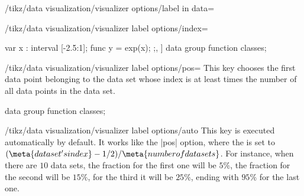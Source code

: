 \begin{key}{/tikz/data visualization/visualizer options/label in data=}
\begin{key}{/tikz/data visualization/visualizer label options/index=}
\begin{codeexample}
{{{    var x : interval [-2.5:1];
    func y = exp(\value x);
  }
};},
]
\tikz \datavisualization [
  school book axes,
  x axis={label=$x$},
  visualize as smooth line/.list={exp},
  exp=    {label in data={text=$5$, index=5},
           label in data={text=$10$, index=10},
           label in data={text=$20$, index=20},
           style={mark=x}},
  style sheet=vary hue]
data group {function classes};
\end{codeexample}
    \end{key}
    \begin{key}{/tikz/data visualization/visualizer label options/pos=}
        This key chooses the first data point belonging to the data set whose
        index is at least  times the number of all data points
        in the data set.
\begin{codeexample}[
    width=6.3cm,
    preamble={\usetikzlibrary{datavisualization.formats.functions}},
    pre={\tikz \datavisualization data group {function classes} = {
  data [set=log, format=function] {
    var x : interval [0.2:2.5];
    func y = ln(\value x);
  }
  data [set=lin, format=function] {
    var x : interval [-2:2.5];
    func y = 0.5*\value x;
  }
  data [set=squared, format=function] {
    var x : interval [-1.5:1.5];
    func y = \value x*\value x;
  }
  data [set=exp, format=function] {
    var x : interval [-2.5:1];
    func y = exp(\value x);
  }
};},
]
\tikz \datavisualization [
  school book axes,
  x axis={label=$x$},
  visualize as smooth line=exp,
  exp=    {label in data={text=$.2$, pos=0.2},
           label in data={text=$.5$, pos=0.5},
           label in data={text=$.95$, pos=0.95},
           style={mark=x}},
  style sheet=vary hue]
data group {function classes};
\end{codeexample}
    \end{key}
    \begin{key}{/tikz/data visualization/visualizer label options/auto}
        This key is executed automatically by default. It works like the |pos|
        option, where the  is set to $(\meta{data set's
        index}-1/2)/\meta{number of data sets}$. For instance, when there are
        $10$ data sets, the fraction for the first one will be $5\%$, the
        fraction for the second will be $15\%$, for the third it will be
        $25\%$, ending with $95\%$ for the last one.


\end{key}
\end{key}
